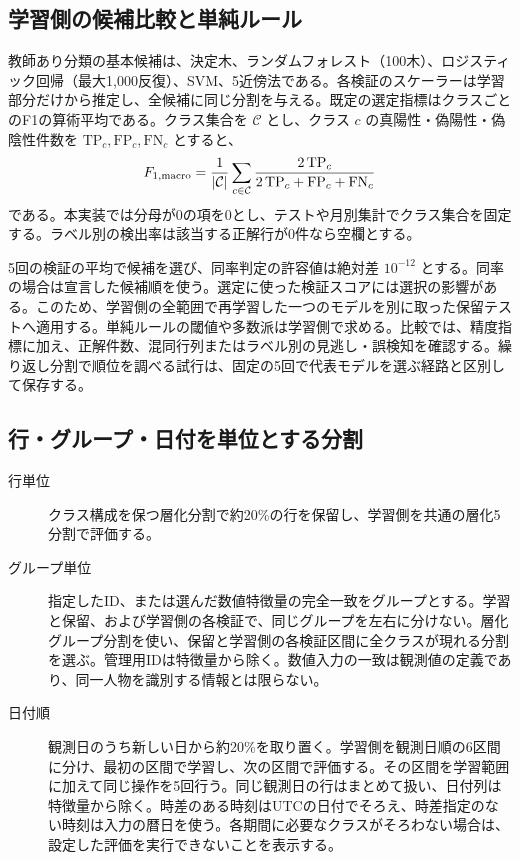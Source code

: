 \subsection{学習側の候補比較と単純ルール}

教師あり分類の基本候補は、決定木、ランダムフォレスト（100木）、ロジスティック回帰（最大1,000反復）、SVM、5近傍法である。各検証のスケーラーは学習部分だけから推定し、全候補に同じ分割を与える。既定の選定指標はクラスごとのF1の算術平均である。クラス集合を \(\mathcal{C}\) とし、クラス \(c\) の真陽性・偽陽性・偽陰性件数を \(\mathrm{TP}_c,\mathrm{FP}_c,\mathrm{FN}_c\) とすると、
\begin{equation}
F_{1,\mathrm{macro}} = \frac{1}{|\mathcal{C}|}\sum_{c\in\mathcal{C}}
  \frac{2\,\mathrm{TP}_c}{2\,\mathrm{TP}_c+\mathrm{FP}_c+\mathrm{FN}_c}
\label{eq:macro}
\end{equation}
である。本実装では分母が0の項を0とし、テストや月別集計でクラス集合を固定する。ラベル別の検出率は該当する正解行が0件なら空欄とする。

5回の検証の平均で候補を選び、同率判定の許容値は絶対差 \(10^{-12}\) とする。同率の場合は宣言した候補順を使う。選定に使った検証スコアには選択の影響がある\cite{varma}。このため、学習側の全範囲で再学習した一つのモデルを別に取った保留テストへ適用する。単純ルールの閾値や多数派は学習側で求める。比較では、精度指標に加え、正解件数、混同行列またはラベル別の見逃し・誤検知を確認する。繰り返し分割で順位を調べる試行は、固定の5回で代表モデルを選ぶ経路と区別して保存する\cite{ranking}。

\subsection{行・グループ・日付を単位とする分割}

\begin{description}
  \item[行単位] クラス構成を保つ層化分割で約20\%の行を保留し、学習側を共通の層化5分割で評価する。
  \item[グループ単位] 指定したID、または選んだ数値特徴量の完全一致をグループとする。学習と保留、および学習側の各検証で、同じグループを左右に分けない。層化グループ分割を使い、保留と学習側の各検証区間に全クラスが現れる分割を選ぶ\cite{groupkfold,audit}。管理用IDは特徴量から除く。数値入力の一致は観測値の定義であり、同一人物を識別する情報とは限らない。
  \item[日付順] 観測日のうち新しい日から約20\%を取り置く。学習側を観測日順の6区間に分け、最初の区間で学習し、次の区間で評価する。その区間を学習範囲に加えて同じ操作を5回行う。同じ観測日の行はまとめて扱い、日付列は特徴量から除く。時差のある時刻はUTCの日付でそろえ、時差指定のない時刻は入力の暦日を使う。各期間に必要なクラスがそろわない場合は、設定した評価を実行できないことを表示する\cite{audit}。
\end{description}

